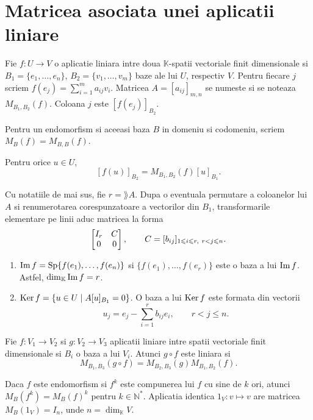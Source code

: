 \documentclass{article}
\begin{document}
\section{Matricea asociata unei aplicatii liniare}
\begin{enumerate}

   Fie $f : U \to V$ o aplicatie liniara intre doua $\mathbb K$-spatii vectoriale finit dimensionale si $B_1=\{e_1,\dots,e_n\}$, $B_2=\{v_1,\dots,v_m\}$ baze ale lui $U$, respectiv $V$. Pentru fiecare $j$ scriem $f(e_j)=\sum_{i=1}^m a_{ij}v_i$. Matricea $A=[a_{ij}]_{m,n}$ se numeste  si se noteaza $M_{B_1,B_2}(f)$. Coloana $j$ este $[f(e_j)]_{B_2}$.

  \notatie Pentru un endomorfism si aceeasi baza $B$ in domeniu si codomeniu, scriem $M_B(f)=M_{B,B}(f)$.

  \proprietate Pentru orice $u\in U$,
  \[
    [f(u)]_{B_2}=M_{B_1,B_2}(f)[u]_{B_1}.
  \]

  \begin{tcolorbox}
    \teorema Cu notatiile de mai sus, fie $r=\rang A$. Dupa o eventuala permutare a coloanelor lui $A$ si renumerotarea corespunzatoare a vectorilor din $B_1$, transformarile elementare pe linii aduc matricea la forma
    \[
      \begin{bmatrix}I_r & C \\ 0 & 0\end{bmatrix}, \qquad C=[b_{ij}]_{1\leqslant i\leqslant r,\ r<j\leqslant n}.
    \]
    \begin{enumerate}
      \item $\operatorname{Im} f=\operatorname{Sp}\{f(e_1),\dots,f(e_n)\}$ si $\{f(e_1),\dots,f(e_r)\}$ este o baza a lui $\operatorname{Im} f$. Astfel, $\dim_{\mathbb K}\operatorname{Im} f=r$.
      \item $\operatorname{Ker} f=\{u\in U\mid A[u]_{B_1}=0\}$. O baza a lui $\operatorname{Ker} f$ este formata din vectorii
      \[
        u_j=e_j-\sum_{i=1}^{r}b_{ij}e_i,\qquad r<j\leq n.
      \]
    \end{enumerate}
  \end{tcolorbox}

  \propozitie Fie $f : V_1 \to V_2$ si $g : V_2 \to V_3$ aplicatii liniare intre spatii vectoriale finit dimensionale si $B_i$ o baza a lui $V_i$. Atunci $g\circ f$ este liniara si
  \[
    M_{B_1,B_3}(g\circ f)=M_{B_2,B_3}(g)M_{B_1,B_2}(f).
  \]

  \observatie Daca $f$ este endomorfism si $f^k$ este compunerea lui $f$ cu sine de $k$ ori, atunci $M_B(f^k)=M_B(f)^k$ pentru $k\in\mathbb N^*$. Aplicatia identica $1_V : v\mapsto v$ are matricea $M_B(1_V)=I_n$, unde $n=\dim_{\mathbb K}V$.


\end{enumerate}
\end{document}
